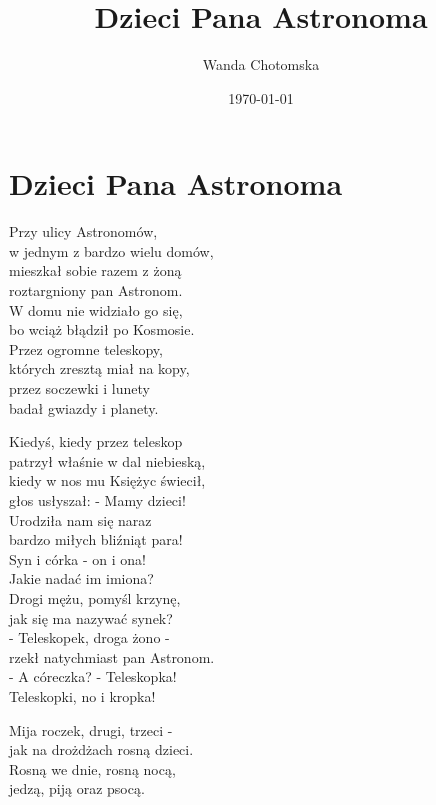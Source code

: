\documentclass[11pt,a4pape,leqno,twoside]{book}
\title{Dzieci Pana Astronoma}
\author{Wanda Chotomska}
\date{\today}
\begin{document}
\maketitle

\chapter{Dzieci Pana Astronoma}
Przy ulicy Astronomów,\\
w jednym z bardzo wielu domów,\\
mieszkał sobie razem z żoną\\
roztargniony pan Astronom.\\
W domu nie widziało go się,\\
bo wciąż błądził po Kosmosie.\\
Przez ogromne teleskopy,\\
których zresztą miał na kopy,\\
przez soczewki i lunety\\
badał gwiazdy i planety.\\ \vspace{0.1cm}

Kiedyś, kiedy przez teleskop\\
patrzył właśnie w dal niebieską,\\
kiedy w nos mu Księżyc świecił,\\
głos usłyszał: - Mamy dzieci!\\
Urodziła nam się naraz\\
bardzo miłych bliźniąt para!\\
Syn i córka - on i ona!\\
Jakie nadać im imiona?\\
Drogi mężu, pomyśl krzynę,\\
jak się ma nazywać synek?\\
- Teleskopek, droga żono -\\
rzekł natychmiast pan Astronom.\\
- A córeczka? - Teleskopka!\\
Teleskopki, no i kropka!\\ \vspace{0.1cm}

Mija roczek, drugi, trzeci -\\
jak na drożdżach rosną dzieci.\\
Rosną we dnie, rosną nocą,\\
jedzą, piją oraz psocą.

\end{document}
